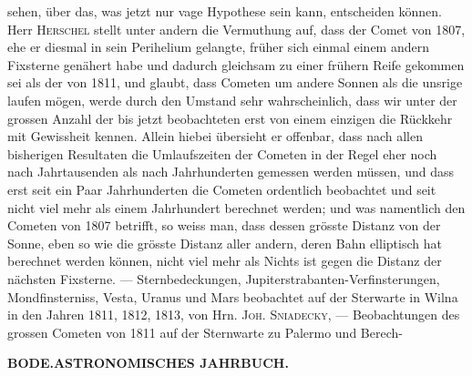 sehen, über das, was jetzt nur vage Hypothese sein kann, entscheiden können. Herr \textsc{Herschel} stellt unter andern die Vermuthung auf, dass der Comet von 1807, ehe er diesmal in sein Perihelium gelangte, früher sich einmal einem andern Fixsterne genähert habe und dadurch gleichsam zu einer frühern Reife gekommen sei als der von 1811, und glaubt, dass Cometen um andere Sonnen als die unsrige laufen mögen, werde durch den Umstand sehr wahrscheinlich, dass wir unter der grossen Anzahl der bis jetzt beobachteten erst von einem einzigen die Rückkehr mit Gewissheit kennen. Allein hiebei übersieht er offenbar, dass nach allen bisherigen Resultaten die Umlaufszeiten der Cometen in der Regel eher noch nach Jahrtausenden als nach Jahrhunderten gemessen werden müssen, und dass erst seit ein Paar Jahrhunderten die Cometen ordentlich beobachtet und seit nicht viel mehr als einem Jahrhundert berechnet werden; und was namentlich den Cometen von 1807 betrifft, so weiss man, dass dessen grösste Distanz von der Sonne, eben so wie die grösste Distanz aller andern, deren Bahn elliptisch hat berechnet werden können, nicht viel mehr als Nichts ist gegen die Distanz der nächsten Fixsterne. — Sternbedeckungen, Jupiterstrabanten-Verfinsterungen, Mondfinsterniss, Vesta, Uranus und Mars beobachtet auf der Sterwarte in Wilna in den Jahren 1811, 1812, 1813, von Hrn. \textsc{Joh. Sniadecky}, — Beobachtungen des grossen Cometen von 1811 auf der Sternwarte zu Palermo und Berech-\par
\clearpage
\thispagestyle{empty}
\noindent{}%
\makebox[12mm][l]{}%
\parbox[t]{\dimexpr\linewidth-24mm\relax}{\centering\footnotesize\bfseries BODE.\enspace ASTRONOMISCHES JAHRBUCH.\par}%
\par\nobreak\medskip
